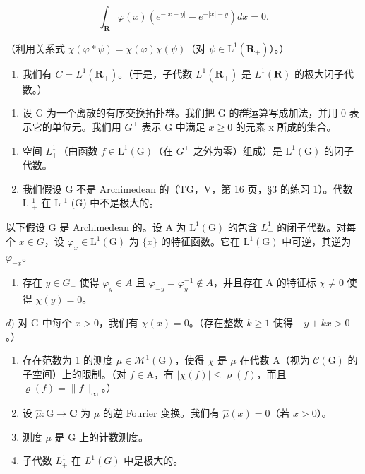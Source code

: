 \[
\int_ {\mathbf {R}} \varphi (x) (e ^ {- | x + y |} - e ^ {- | x | - y}) d x = 0.
\]

（利用关系式 \(\chi (\varphi *\psi) = \chi (\varphi)\chi (\psi)\)（对 \(\psi \in \mathrm{L}^1 (\mathbf{R}_+)\)）。）

\begin{enumerate}
\def\labelenumi{\alph{enumi})}
\setcounter{enumi}{7}
\tightlist
\item
  我们有 \(C = L^{1}(\mathbf{R}_{+})\)。（于是，子代数 \(L^{1}(\mathbf{R}_{+})\) 是 \(L^{1}(\mathbf{R})\) 的极大闭子代数。）
\end{enumerate}

\begin{enumerate}
\def\labelenumi{\arabic{enumi})}
\setcounter{enumi}{17}
\tightlist
\item
  设 G 为一个离散的有序交换拓扑群。我们把 G 的群运算写成加法，并用 0 表示它的单位元。我们用 \(G^{+}\) 表示 G 中满足 \(x \geqslant 0\) 的元素 x 所成的集合。
\end{enumerate}

\begin{enumerate}
\def\labelenumi{\alph{enumi})}
\item
  空间 \(L_{+}^{1}\)（由函数 \(f \in \mathrm{L}^{1}(\mathrm{G})\)（在 \(G^{+}\) 之外为零）组成）是 \(\mathrm{L}^{1}(\mathrm{G})\) 的闭子代数。
\item
  我们假设 G 不是 Archimedean 的（TG，V，第 16 页，§3 的练习 1）。代数 L \(_{+}^{1}\) 在 L \(^{1}\) (G) 中不是极大的。
\end{enumerate}

以下假设 G 是 Archimedean 的。设 A 为 \(\mathrm{L}^{1}(\mathrm{G})\) 的包含 \(L_{+}^{1}\) 的闭子代数。对每个 \(x \in G\)，设 \(\varphi_{x} \in \mathrm{L}^{1}(\mathrm{G})\) 为 \(\{x\}\) 的特征函数。它在 \(\mathrm{L}^{1}(\mathrm{G})\) 中可逆，其逆为 \(\varphi_{-x}\)。

\begin{enumerate}
\def\labelenumi{\alph{enumi})}
\setcounter{enumi}{2}
\tightlist
\item
  存在 \(y \in G_{+}\) 使得 \(\varphi_{y} \in A\) 且 \(\varphi_{-y} = \varphi_{y}^{-1} \notin A\)，并且存在 A 的特征标 \(\chi \neq 0\) 使得 \(\chi(y) = 0\)。
\end{enumerate}

\(d)\) 对 G 中每个 \(x > 0\)，我们有 \(\chi(x) = 0\)。（存在整数 \(k \geqslant 1\) 使得 \(-y + kx > 0\)。）

\begin{enumerate}
\def\labelenumi{\alph{enumi})}
\setcounter{enumi}{4}
\item
  存在范数为 1 的测度 \(\mu \in \mathcal{M}^1 (\mathrm{G})\)，使得 \(\chi\) 是 \(\mu\) 在代数 A（视为 \(\mathcal{C}(\mathrm{G})\) 的子空间）上的限制。（对 \(f\in \mathrm{A}\)，有 \(|\chi (f)|\leqslant \varrho (f)\)，而且 \(\varrho (f) = \| f\|_{\infty}\)。）
\item
  设 \(\widehat{\mu}\colon\mathrm{G}\to\mathbf{C}\) 为 \(\mu\) 的逆 Fourier 变换。我们有 \(\widehat{\mu}(x)=0\)（若 \(x>0\)）。
\item
  测度 \(\mu\) 是 G 上的计数测度。
\item
  子代数 \(L_{+}^{1}\) 在 \(L^{1}(G)\) 中是极大的。
\end{enumerate}


